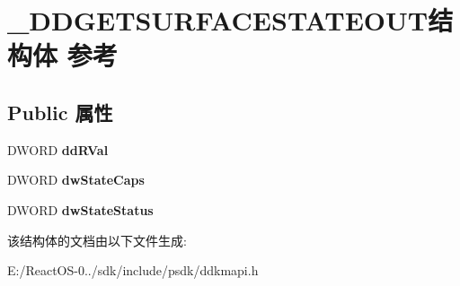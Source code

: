 \hypertarget{struct___d_d_g_e_t_s_u_r_f_a_c_e_s_t_a_t_e_o_u_t}{}\section{\+\_\+\+D\+D\+G\+E\+T\+S\+U\+R\+F\+A\+C\+E\+S\+T\+A\+T\+E\+O\+U\+T结构体 参考}
\label{struct___d_d_g_e_t_s_u_r_f_a_c_e_s_t_a_t_e_o_u_t}
\subsection*{Public 属性}
\begin{DoxyCompactItemize}
\item 
\mbox{\label{struct___d_d_g_e_t_s_u_r_f_a_c_e_s_t_a_t_e_o_u_t_a26682de3dfb20c46a1ce83614829292f}} 
D\+W\+O\+RD {\bfseries dd\+R\+Val}
\item 
\mbox{\label{struct___d_d_g_e_t_s_u_r_f_a_c_e_s_t_a_t_e_o_u_t_a1ff7be4a37cdd4a2c99884f2327cd611}} 
D\+W\+O\+RD {\bfseries dw\+State\+Caps}
\item 
\mbox{\label{struct___d_d_g_e_t_s_u_r_f_a_c_e_s_t_a_t_e_o_u_t_adcbd2ebdfa7ff41384a3b16be92e9eb1}} 
D\+W\+O\+RD {\bfseries dw\+State\+Status}
\end{DoxyCompactItemize}


该结构体的文档由以下文件生成\+:\begin{DoxyCompactItemize}
\item 
E\+:/\+React\+O\+S-\/0../sdk/include/psdk/ddkmapi.\+h\end{DoxyCompactItemize}
